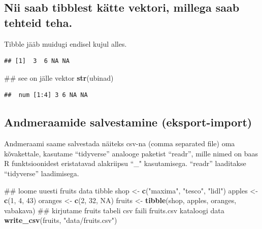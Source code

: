 \documentclass[]{book}
\newenvironment{Shaded}{\begin{snugshade}}{\end{snugshade}}
\newcommand{\KeywordTok}[1]{\textcolor[rgb]{0.13,0.29,0.53}{\textbf{#1}}}
\newcommand{\DecValTok}[1]{\textcolor[rgb]{0.00,0.00,0.81}{#1}}
\newcommand{\StringTok}[1]{\textcolor[rgb]{0.31,0.60,0.02}{#1}}
\newcommand{\OtherTok}[1]{\textcolor[rgb]{0.56,0.35,0.01}{#1}}
\newcommand{\OperatorTok}[1]{\textcolor[rgb]{0.81,0.36,0.00}{\textbf{#1}}}
\newcommand{\NormalTok}[1]{#1}
\begin{document}
\subsection{Nii saab tibblest kätte vektori, millega saab tehteid
teha.}\label{nii-saab-tibblest-katte-vektori-millega-saab-tehteid-teha.}

Tibble jääb muidugi endisel kujul alles.

\begin{Shaded}
\end{Shaded}

\begin{verbatim}
## [1]  3  6 NA NA
\end{verbatim}

\begin{Shaded}
\begin{Highlighting}[]
\NormalTok{## see on jälle vektor}
\KeywordTok{str}\NormalTok{(ubinad)}
\end{Highlighting}
\end{Shaded}

\begin{verbatim}
##  num [1:4] 3 6 NA NA
\end{verbatim}

\subsection{Andmeraamide salvestamine
(eksport-import)}\label{andmeraamide-salvestamine-eksport-import}

Andmeraami saame salvestada näiteks csv-na (comma separated file) oma
kõvakettale, kasutame ``tidyverse'' analooge paketist ``readr'', mille
nimed on baas R funktsioonidest eristatavad alakriipsu ``\_"
kasutamisega. ``readr'' laaditakse ``tidyverse'' laadimisega.

\begin{Shaded}
\begin{Highlighting}[]
\NormalTok{## loome uuesti fruits data tibble}
\NormalTok{shop <-}\StringTok{ }\KeywordTok{c}\NormalTok{(}\StringTok{"maxima"}\NormalTok{, }\StringTok{"tesco"}\NormalTok{, }\StringTok{"lidl"}\NormalTok{)}
\NormalTok{apples <-}\StringTok{ }\KeywordTok{c}\NormalTok{(}\DecValTok{1}\NormalTok{, }\DecValTok{4}\NormalTok{, }\DecValTok{43}\NormalTok{)}
\NormalTok{oranges <-}\StringTok{ }\KeywordTok{c}\NormalTok{(}\DecValTok{2}\NormalTok{, }\DecValTok{32}\NormalTok{, }\OtherTok{NA}\NormalTok{)}
\NormalTok{fruits <-}\StringTok{ }\KeywordTok{tibble}\NormalTok{(shop, apples, oranges, vabakava)}
\NormalTok{## kirjutame fruits tabeli csv faili fruits.csv kataloogi data }
\KeywordTok{write_csv}\NormalTok{(fruits, }\StringTok{"data/fruits.csv"}\NormalTok{)}
\end{Highlighting}
\end{Shaded}
\end{document}
